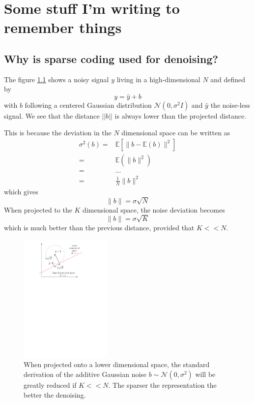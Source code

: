 \clearpage
{}
\appendix

\chapter{Some stuff I'm writing to remember things}

\section{Why is sparse coding used for denoising?}

The figure \ref{sparse_reduce_noise} shows a noisy signal $y$ living in a high-dimensional $N$ and defined by
$$y=\hat{y} + b$$
with $b$ following a centered Gaussian distribution $\mathcal{N}(0,\sigma^2I)$ and $\hat{y}$ the noise-less signal. We see that the distance $||b||$ is always lower than the projected distance.

This is because the deviation in the $N$ dimensional space can be written as
\begin{align*}
\sigma^2(b) =& \mathbb{E}\left[\lVert b-\mathbb{E}(b) \rVert^2 \right]\\
=& \mathbb{E}\left(\lVert b \rVert^2 \right)\\
=& ... \\ %
=& \frac{1}{N}\lVert b \rVert^2
\end{align*}
which gives 
$$ \lVert b \rVert = \sigma\sqrt{N} $$
When projected to the $K$ dimensional space, the noise deviation becomes
$$\lVert b \rVert = \sigma\sqrt{K} $$
which is much better than the previous distance, provided that $K<<N$. 

\begin{figure}[!ht]\centering
\includegraphics[width=0.4\textwidth]{figures/sparse-reduce-noise.pdf}
\caption{When projected onto a lower dimensional space, the standard derivation of the additive Gaussian noise $b \sim \mathcal{N}(0,\sigma^2)$ will be greatly reduced if $K<<N$. The sparser the representation the better the denoising. \label{sparse_reduce_noise}}
\end{figure}

